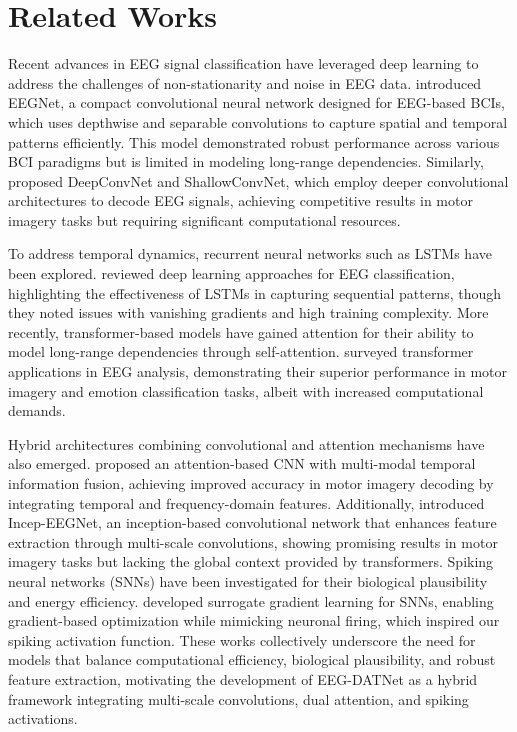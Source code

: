 \documentclass[pdflatex,sn-mathphys-num]{sn-jnl}
\theoremstyle{thmstyleone}%
\theoremstyle{thmstyletwo}%
\theoremstyle{thmstylethree}%
\begin{document}
\section{Related Works}
Recent advances in EEG signal classification have leveraged deep learning to address the challenges of non-stationarity and noise in EEG data. \citet{lawhern2018eegnet} introduced EEGNet, a compact convolutional neural network designed for EEG-based BCIs, which uses depthwise and separable convolutions to capture spatial and temporal patterns efficiently. This model demonstrated robust performance across various BCI paradigms but is limited in modeling long-range dependencies. Similarly, \citet{schirrmeister2017deep} proposed DeepConvNet and ShallowConvNet, which employ deeper convolutional architectures to decode EEG signals, achieving competitive results in motor imagery tasks but requiring significant computational resources.

To address temporal dynamics, recurrent neural networks such as LSTMs have been explored. \citet{craik2019deep} reviewed deep learning approaches for EEG classification, highlighting the effectiveness of LSTMs in capturing sequential patterns, though they noted issues with vanishing gradients and high training complexity. More recently, transformer-based models have gained attention for their ability to model long-range dependencies through self-attention. \citet{vafaei2025transformers} surveyed transformer applications in EEG analysis, demonstrating their superior performance in motor imagery and emotion classification tasks, albeit with increased computational demands.

Hybrid architectures combining convolutional and attention mechanisms have also emerged. \citet{ma2024attention} proposed an attention-based CNN with multi-modal temporal information fusion, achieving improved accuracy in motor imagery decoding by integrating temporal and frequency-domain features. Additionally, \citet{zhang2020inception} introduced Incep-EEGNet, an inception-based convolutional network that enhances feature extraction through multi-scale convolutions, showing promising results in motor imagery tasks but lacking the global context provided by transformers.
Spiking neural networks (SNNs) have been investigated for their biological plausibility and energy efficiency. \citet{neftci2019surrogate} developed surrogate gradient learning for SNNs, enabling gradient-based optimization while mimicking neuronal firing, which inspired our spiking activation function. These works collectively underscore the need for models that balance computational efficiency, biological plausibility, and robust feature extraction, motivating the development of EEG-DATNet as a hybrid framework integrating multi-scale convolutions, dual attention, and spiking activations.
\end{document}
